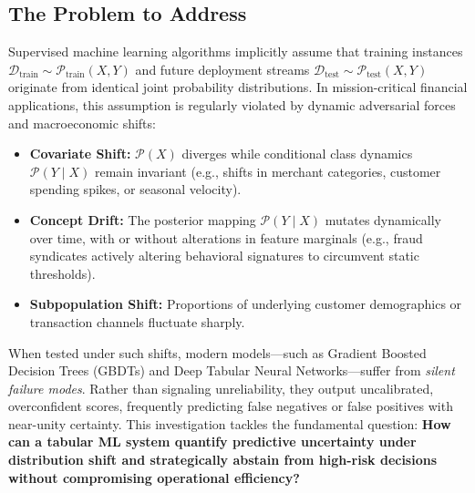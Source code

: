 \documentclass[10pt,a4paper,twocolumn]{article}
\begin{document}
\subsection{The Problem to Address}
Supervised machine learning algorithms implicitly assume that training instances $\mathcal{D}_{\text{train}} \sim \mathcal{P}_{\text{train}}(X,Y)$ and future deployment streams $\mathcal{D}_{\text{test}} \sim \mathcal{P}_{\text{test}}(X,Y)$ originate from identical joint probability distributions. In mission-critical financial applications, this assumption is regularly violated by dynamic adversarial forces and macroeconomic shifts:
\begin{itemize}
  \item \textbf{Covariate Shift:} $\mathcal{P}(X)$ diverges while conditional class dynamics $\mathcal{P}(Y \mid X)$ remain invariant (e.g., shifts in merchant categories, customer spending spikes, or seasonal velocity).
  \item \textbf{Concept Drift:} The posterior mapping $\mathcal{P}(Y \mid X)$ mutates dynamically over time, with or without alterations in feature marginals (e.g., fraud syndicates actively altering behavioral signatures to circumvent static thresholds).
  \item \textbf{Subpopulation Shift:} Proportions of underlying customer demographics or transaction channels fluctuate sharply.
\end{itemize}

When tested under such shifts, modern models—such as Gradient Boosted Decision Trees (GBDTs) and Deep Tabular Neural Networks—suffer from \emph{silent failure modes}. Rather than signaling unreliability, they output uncalibrated, overconfident scores, frequently predicting false negatives or false positives with near-unity certainty.  This investigation tackles the fundamental question: \textbf{How can a tabular ML system quantify predictive uncertainty under distribution shift and strategically abstain from high-risk decisions without compromising operational efficiency?}
\end{document}
